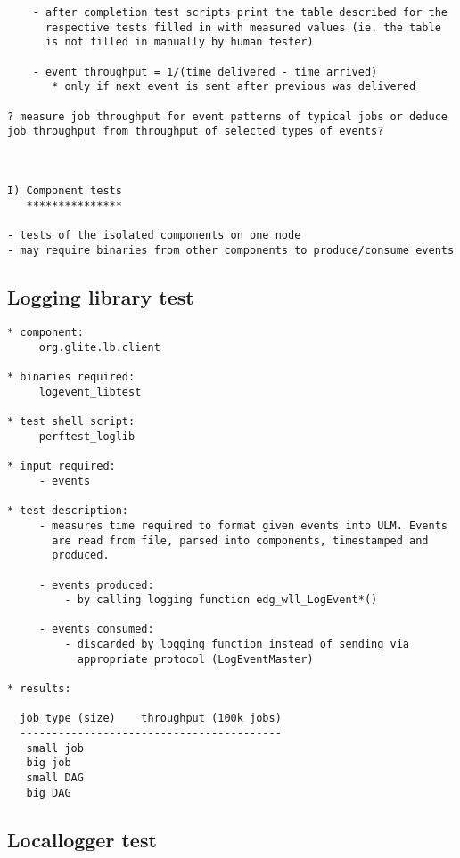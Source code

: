 \begin{verbatim}
    - after completion test scripts print the table described for the
      respective tests filled in with measured values (ie. the table
      is not filled in manually by human tester)
 
    - event throughput = 1/(time_delivered - time_arrived)
       * only if next event is sent after previous was delivered

? measure job throughput for event patterns of typical jobs or deduce
job throughput from throughput of selected types of events?



I) Component tests 
   ***************

- tests of the isolated components on one node
- may require binaries from other components to produce/consume events

\end{verbatim}

\subsection{Logging library test}

\begin{verbatim}
* component:  
     org.glite.lb.client

* binaries required: 
     logevent_libtest

* test shell script:
     perftest_loglib

* input required:
     - events

* test description:
     - measures time required to format given events into ULM. Events
       are read from file, parsed into components, timestamped and
       produced. 

     - events produced:
         - by calling logging function edg_wll_LogEvent*()

     - events consumed:
         - discarded by logging function instead of sending via
           appropriate protocol (LogEventMaster)

* results:

  job type (size)    throughput (100k jobs)
  -----------------------------------------
   small job
   big job
   small DAG
   big DAG

\end{verbatim}


\subsection{Locallogger test}

